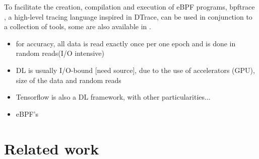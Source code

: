 \documentclass[conference]{IEEEtran}
\begin{document}
    To facilitate the creation, compilation and execution of eBPF programs, bpftrace \cite{bpftrace}, a high-level tracing language inspired in DTrace, can be used in conjunction to a collection of tools, some are also available in \cite{bgreggBook}.
\begin{itemize}
    \item for accuracy, all data is read exactly once per one epoch and is done in random reads(I/O intensive)
    \item DL is usually I/O-bound [need source], due to the use of accelerators (GPU), size of the data and random reads
    \item Tensorflow is also a DL framework, with other particularities...
    \item eBPF's
\end{itemize}

\section{Related work}

\end{document}

